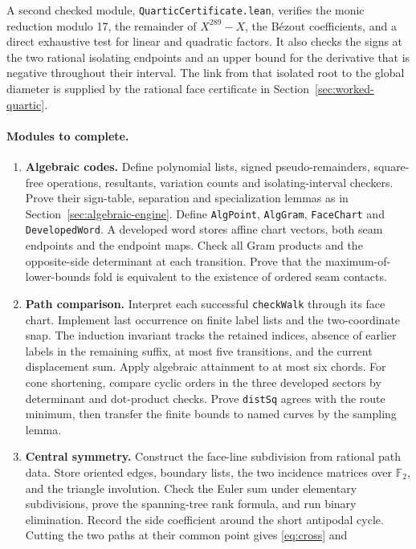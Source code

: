 \documentclass[10pt,letterpaper]{article}
\begin{document}
A second checked module, \texttt{QuarticCertificate.lean}, verifies
the monic reduction modulo 17, the remainder of $X^{289}-X$, the
Bézout coefficients, and a direct exhaustive test for linear and
quadratic factors. It also checks the signs at the two rational
isolating endpoints and an upper bound for the derivative that is
negative throughout their interval. The link from that isolated root
to the global diameter is supplied by the rational face certificate
in Section~\ref{sec:worked-quartic}.

\paragraph{Modules to complete.}
\begin{enumerate}
\item \textbf{Algebraic codes.} Define polynomial lists, signed
pseudo-remainders, square-free operations, resultants, variation
counts and isolating-interval checkers. Prove their sign-table,
separation and specialization lemmas as in
Section~\ref{sec:algebraic-engine}. Define \texttt{AlgPoint},
\texttt{AlgGram}, \texttt{FaceChart} and \texttt{DevelopedWord}.
A developed word stores affine chart vectors, both seam endpoints
and the endpoint maps. Check all Gram products and the opposite-side
determinant at each transition. Prove that the maximum-of-lower-bounds
fold is equivalent to the existence of ordered seam contacts.
\item \textbf{Path comparison.} Interpret each successful
\texttt{checkWalk} through its face chart. Implement last occurrence
on finite label lists and the two-coordinate snap. The induction
invariant tracks the retained indices, absence of earlier labels
in the remaining suffix, at most five transitions, and the current
displacement sum. Apply algebraic attainment to at most six chords.
For cone shortening, compare cyclic orders in the three developed
sectors by determinant and dot-product checks. Prove
\texttt{distSq} agrees with the route minimum, then transfer the
finite bounds to named curves by the sampling lemma.
\item \textbf{Central symmetry.} Construct the face-line subdivision
from rational path data. Store oriented edges, boundary lists, the
two incidence matrices over $\mathbb F_2$, and the triangle
involution. Check the Euler sum under elementary subdivisions,
prove the spanning-tree rank formula, and run binary elimination.
Record the side coefficient around the short antipodal cycle. Cutting
the two paths at their common point gives \eqref{eq:cross} and

\end{enumerate}
\end{document}
